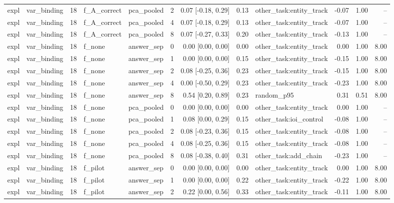 \begin{tabular}{llrllrrrlrrr}
expl & var\_binding & 18 & f\_A\_correct & pca\_pooled & 2 & 0.07 [-0.18, 0.29] & 0.13 & other\_task:entity\_track & -0.07 & 1.00 & -- \\
expl & var\_binding & 18 & f\_A\_correct & pca\_pooled & 4 & 0.07 [-0.18, 0.29] & 0.13 & other\_task:entity\_track & -0.07 & 1.00 & -- \\
expl & var\_binding & 18 & f\_A\_correct & pca\_pooled & 8 & 0.07 [-0.27, 0.33] & 0.20 & other\_task:entity\_track & -0.13 & 1.00 & -- \\
expl & var\_binding & 18 & f\_none & answer\_sep & 0 & 0.00 [0.00, 0.00] & 0.00 & other\_task:entity\_track & 0.00 & 1.00 & 8.00 \\
expl & var\_binding & 18 & f\_none & answer\_sep & 1 & 0.00 [0.00, 0.00] & 0.15 & other\_task:entity\_track & -0.15 & 1.00 & 8.00 \\
expl & var\_binding & 18 & f\_none & answer\_sep & 2 & 0.08 [-0.25, 0.36] & 0.23 & other\_task:entity\_track & -0.15 & 1.00 & 8.00 \\
expl & var\_binding & 18 & f\_none & answer\_sep & 4 & 0.00 [-0.50, 0.29] & 0.23 & other\_task:entity\_track & -0.23 & 1.00 & 8.00 \\
expl & var\_binding & 18 & f\_none & answer\_sep & 8 & 0.54 [0.20, 0.89] & 0.23 & random\_p95 & 0.31 & 0.51 & 8.00 \\
expl & var\_binding & 18 & f\_none & pca\_pooled & 0 & 0.00 [0.00, 0.00] & 0.00 & other\_task:entity\_track & 0.00 & 1.00 & -- \\
expl & var\_binding & 18 & f\_none & pca\_pooled & 1 & 0.08 [0.00, 0.29] & 0.15 & other\_task:ioi\_control & -0.08 & 1.00 & -- \\
expl & var\_binding & 18 & f\_none & pca\_pooled & 2 & 0.08 [-0.23, 0.36] & 0.15 & other\_task:entity\_track & -0.08 & 1.00 & -- \\
expl & var\_binding & 18 & f\_none & pca\_pooled & 4 & 0.08 [-0.25, 0.36] & 0.15 & other\_task:entity\_track & -0.08 & 1.00 & -- \\
expl & var\_binding & 18 & f\_none & pca\_pooled & 8 & 0.08 [-0.38, 0.40] & 0.31 & other\_task:add\_chain & -0.23 & 1.00 & -- \\
expl & var\_binding & 18 & f\_pilot & answer\_sep & 0 & 0.00 [0.00, 0.00] & 0.00 & other\_task:entity\_track & 0.00 & 1.00 & 8.00 \\
expl & var\_binding & 18 & f\_pilot & answer\_sep & 1 & 0.00 [0.00, 0.00] & 0.22 & other\_task:entity\_track & -0.22 & 1.00 & 8.00 \\
expl & var\_binding & 18 & f\_pilot & answer\_sep & 2 & 0.22 [0.00, 0.56] & 0.33 & other\_task:entity\_track & -0.11 & 1.00 & 8.00 \\

\end{tabular}
